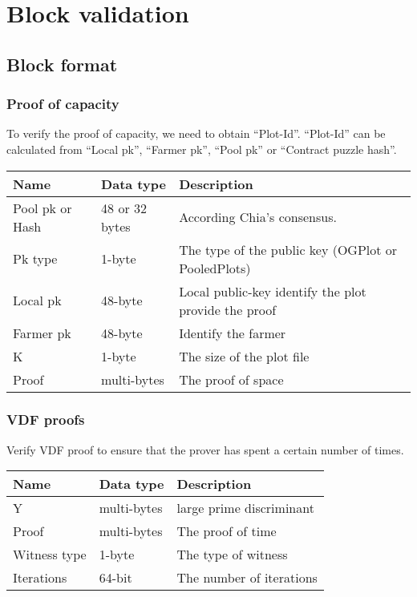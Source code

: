 \section{Block validation}
\subsection{Block format}
\subsubsection{Proof of capacity}
\begin{flushleft}
    To verify the proof of capacity, we need to obtain ``Plot-Id''. ``Plot-Id'' can be calculated from ``Local pk'', ``Farmer pk'', ``Pool pk'' or ``Contract puzzle hash''.
\end{flushleft}
\begin{tabular}{ |p{3cm}|p{3cm}|p{6cm}| }
    \hline
    \rowcolor{lightgray}\textbf{Name} & \textbf{Data type} & \textbf{Description} \\[5pt]
    \hline
    Pool pk or Hash & 48 or 32 bytes & According Chia's consensus.\\[5pt]
    \rowcolor{lightgray!30} Pk type & 1-byte & The type of the public key (OGPlot or PooledPlots) \\[5pt]
    Local pk & 48-byte & Local public-key identify the plot provide the proof \\[5pt]
    \rowcolor{lightgray!30} Farmer pk & 48-byte & Identify the farmer \\[5pt]
    K & 1-byte & The size of the plot file \\[5pt]
    \rowcolor{lightgray!30} Proof & multi-bytes & The proof of space \\[5pt]
    \hline
\end{tabular}
\subsubsection{VDF proofs}
\begin{flushleft}
    Verify VDF proof to ensure that the prover has spent a certain number of times.
\end{flushleft}
\begin{tabular}{ |p{3cm}|p{3cm}|p{6cm}| }
    \hline
    \rowcolor{lightgray}\textbf{Name} & \textbf{Data type} & \textbf{Description} \\[5pt]
    \hline
    Y & multi-bytes & large prime discriminant \\[5pt]
    \rowcolor{lightgray!30} Proof & multi-bytes & The proof of time \\[5pt]
    Witness type & 1-byte & The type of witness \\[5pt]
    \rowcolor{lightgray!30} Iterations & 64-bit & The number of iterations \\[5pt]
    \hline
\end{tabular}
